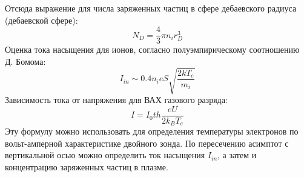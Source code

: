 \documentclass[a4paper, 12pt]{article}
\begin{document}
Отсюда выражение для числа заряженных частиц в сфере дебаевского радиуса (дебаевской сфере):
\begin{equation}
    N_{D} = \frac{4}{3}\pi n_{i}r^3_{D}
    \label{число заряженных частиц в дебаевской сфере}
\end{equation}
Оценка тока насыщения для ионов, согласно полуэмпирическому соотношению Д. Бомома:
\begin{equation}
    I_{in} \sim 0.4n_{i}eS\sqrt{\frac{2kT_{e}}{m_{i}}}
    \label{ток насыщения}
\end{equation}
Зависимость тока от напряжения для ВАХ газового разряда:
\begin{equation}
    I = I_{0}th\frac{eU}{2k_{B}T_{e}}
    \label{зависимость тока от напряжения для двойного зонда}
\end{equation}
Эту формулу можно использовать для определения температуры электронов по вольт-амперной характеристике двойного зонда.
По пересечению асимптот с вертикальной осью можно определить ток насыщения $I_{in}$, а затем и концентрацию заряженных частиц в плазме.
\end{document}
